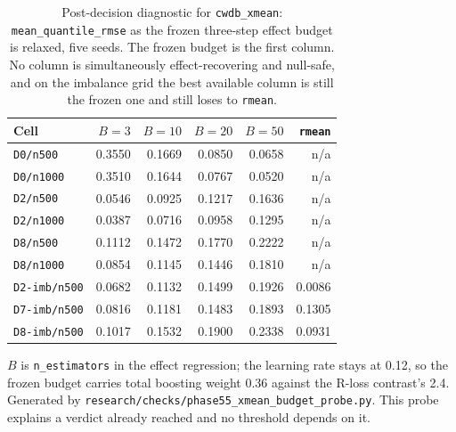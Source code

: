 \begin{table}[htbp]
\centering
\caption{Post-decision diagnostic for \texttt{cwdb\_xmean}: \texttt{mean\_quantile\_rmse} as the frozen three-step effect budget is relaxed, five seeds. The frozen budget is the first column. No column is simultaneously effect-recovering and null-safe, and on the imbalance grid the best available column is still the frozen one and still loses to \texttt{rmean}.}
\label{tab:p55-budget}
\small
\begin{tabular}{@{}lrrrrr@{}}
\toprule
Cell & $B=3$ & $B=10$ & $B=20$ & $B=50$ & \texttt{rmean} \\
\midrule
\texttt{D0/n500} & 0.3550 & 0.1669 & 0.0850 & 0.0658 & n/a \\
\texttt{D0/n1000} & 0.3510 & 0.1644 & 0.0767 & 0.0520 & n/a \\
\texttt{D2/n500} & 0.0546 & 0.0925 & 0.1217 & 0.1636 & n/a \\
\texttt{D2/n1000} & 0.0387 & 0.0716 & 0.0958 & 0.1295 & n/a \\
\texttt{D8/n500} & 0.1112 & 0.1472 & 0.1770 & 0.2222 & n/a \\
\texttt{D8/n1000} & 0.0854 & 0.1145 & 0.1446 & 0.1810 & n/a \\
\midrule
\texttt{D2-imb/n500} & 0.0682 & 0.1132 & 0.1499 & 0.1926 & 0.0086 \\
\texttt{D7-imb/n500} & 0.0816 & 0.1181 & 0.1483 & 0.1893 & 0.1305 \\
\texttt{D8-imb/n500} & 0.1017 & 0.1532 & 0.1900 & 0.2338 & 0.0931 \\
\bottomrule
\end{tabular}
\par\vspace{2pt}\parbox{0.9\textwidth}{\scriptsize $B$ is \texttt{n\_estimators} in the effect regression; the learning rate stays at 0.12, so the frozen budget carries total boosting weight 0.36 against the R-loss contrast's 2.4. Generated by \texttt{research/checks/phase55\_xmean\_budget\_probe.py}. This probe explains a verdict already reached and no threshold depends on it.}
\end{table}

